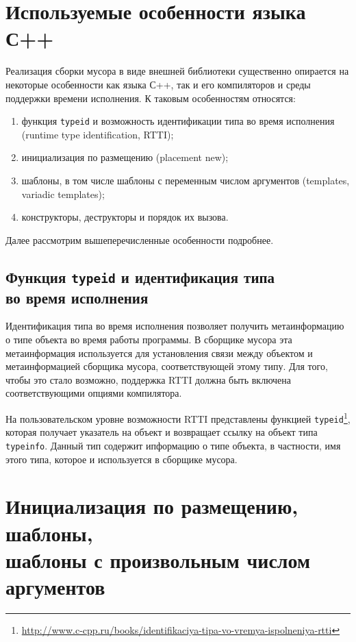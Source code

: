 \section{Используемые особенности языка С++}

Реализация сборки мусора в виде внешней библиотеки существенно опирается 
на некоторые особенности как языка С++, так и его компиляторов и среды поддержки времени 
исполнения. К таковым особенностям относятся:

\begin{enumerate}
\item функция \lstinline{typeid} и возможность идентификации типа во время исполнения (runtime type identification, RTTI);
\item инициализация по размещению (placement new);
\item шаблоны, в том числе шаблоны с переменным числом аргументов (templates, variadic templates);
\item конструкторы, деструкторы и порядок их вызова.
\end{enumerate}

Далее рассмотрим вышеперечисленные особенности подробнее.

\subsection{Функция \lstinline{typeid} и идентификация типа\\
во время исполнения} 

Идентификация типа во время исполнения позволяет получить метаинформацию о типе объекта во время работы программы. 
В сборщике мусора эта метаинформация используется для установления связи между объектом и метаинформацией сборщика
мусора, соответствующей этому типу. Для того, чтобы это стало возможно, поддержка RTTI должна быть включена 
соответствующими опциями компилятора.

На пользовательском уровне возможности RTTI представлены функцией \lstinline{typeid}\footnote{\url{http://www.c-cpp.ru/books/identifikaciya-tipa-vo-vremya-ispolneniya-rtti}},
которая получает указатель на объект и возвращает ссылку на объект типа \lstinline{typeinfo}. Данный тип
содержит ипформацию о типе объекта, в частности, имя этого типа, которое и используется в сборщике мусора.

\section{Инициализация по размещению, шаблоны,\\
шаблоны с произвольным числом аргументов} 

